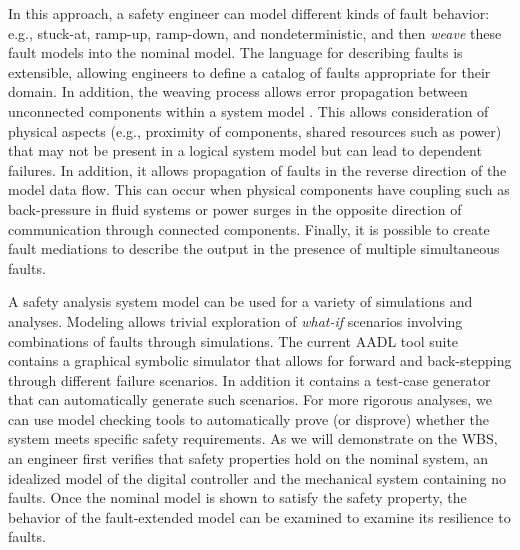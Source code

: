 In this approach, a safety engineer can model different kinds of fault behavior: e.g., stuck-at, ramp-up, ramp-down, and nondeterministic, and then {\em weave} these fault models into the nominal model. The language for describing faults is extensible, allowing engineers to define a catalog of faults appropriate for their domain. In addition, the weaving process allows error propagation between unconnected components within a system model \cite{Joshi07:Hase}. This allows consideration of physical aspects (e.g., proximity of components, shared resources such as power) that may not be present in a logical system model but can lead to dependent failures. In addition, it allows propagation of faults in the reverse direction of the model data flow. This can occur when physical components have coupling such as back-pressure in fluid systems or power surges in the opposite direction of communication through connected components. Finally, it is possible to create fault mediations to describe the output in the presence of multiple simultaneous faults.





A safety analysis system model can be used for a variety of simulations and analyses.  Modeling allows trivial exploration of \textit{what-if} scenarios involving combinations of faults through simulations.  The current AADL tool suite contains a graphical symbolic simulator that allows for forward and back-stepping through different failure scenarios.  In addition it contains a test-case generator that can automatically generate such scenarios.
For more rigorous analyses, we can use model checking tools to automatically prove (or disprove) whether the system meets specific safety requirements.  As we will demonstrate on the WBS, an engineer first verifies that safety properties hold on the nominal system, an idealized model of the digital controller and the mechanical system containing no faults.  Once the nominal model is shown to satisfy the safety property, the behavior of the fault-extended model can be examined to examine its resilience to faults.

